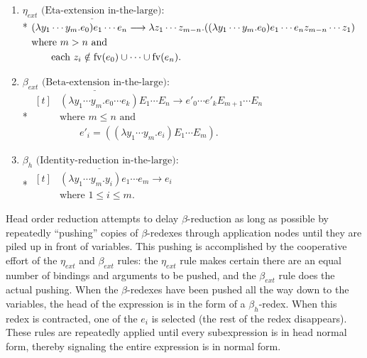 \begin{enumerate}
\item \(\underline{\eta_{ext}\text{ (Eta-extension in-the-large)}}\):\\*
\(\begin{aligned}[t]
&(\lambda y_1\cdots y_m.e_0)e_1\cdots e_n
\longrightarrow
\lambda z_1\cdots z_{m-n}.((\lambda y_1\cdots y_m.e_0)e_1\cdots e_n
z_{m-n}\cdots z_1)\\
&\text{where }m>n\text{ and}\\
&\qquad\text{each }z_i\notin\operatorname{fv}(e_0)\cup\cdots\cup\operatorname{fv}(e_n).
\end{aligned}\)

\item \(\underline{\beta_{ext}\text{ (Beta-extension in-the-large)}}\):\\*
\(\begin{aligned}[t]
&(\lambda y_1\cdots y_m.e_0\cdots e_k)E_1\cdots E_n
\longrightarrow e'_0\cdots e'_k E_{m+1}\cdots E_n\\
&\text{where }m\le n\text{ and}\\
&\qquad e'_i=((\lambda y_1\cdots y_m.e_i)E_1\cdots E_m).
\end{aligned}\)

\item \(\underline{\beta_h\text{ (Identity-reduction in-the-large)}}\):\\*
\(\begin{aligned}[t]
&(\lambda y_1\cdots y_m.y_i)e_1\cdots e_m\longrightarrow e_i\\
&\text{where }1\le i\le m.
\end{aligned}\)
\end{enumerate}

Head order reduction attempts to delay \(\beta\)-reduction as long as possible
by repeatedly ``pushing'' copies of \(\beta\)-redexes through application nodes
until they are piled up in front of variables. This pushing is accomplished by
the cooperative effort of the \(\eta_{ext}\) and \(\beta_{ext}\) rules: the
\(\eta_{ext}\) rule makes certain there are an equal number of bindings and
arguments to be pushed, and the \(\beta_{ext}\) rule does the actual pushing.
When the \(\beta\)-redexes have been pushed all the way down to the variables,
the head of the expression is in the form of a \(\beta_h\)-redex. When this
redex is contracted, one of the \(e_i\) is selected (the rest of the redex
disappears). These rules are repeatedly applied until every subexpression is in
head normal form, thereby signaling the entire expression is in normal form.

